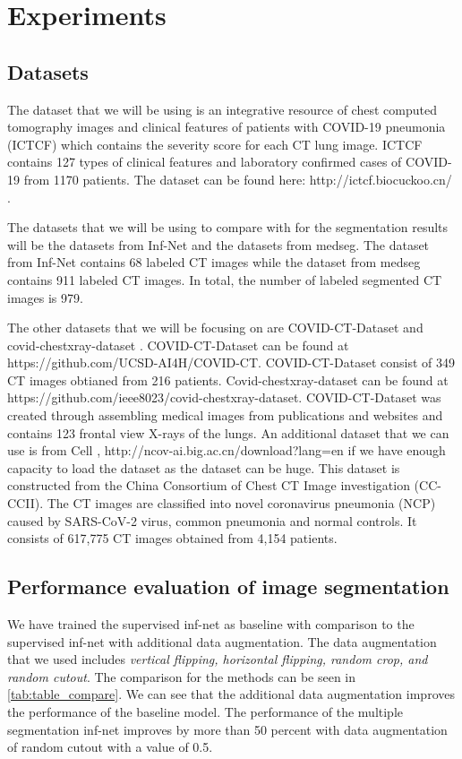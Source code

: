 \section{Experiments}

\subsection{Datasets}
The dataset that we will be using is an integrative resource of chest computed tomography images and clinical features of patients with COVID-19 pneumonia (ICTCF) \cite{ref23} which contains the severity score for each CT lung image. ICTCF contains 127 types of clinical features and laboratory confirmed cases of COVID-19 from 1170 patients. The dataset can be found here: http://ictcf.biocuckoo.cn/ . 

The datasets that we will be using to compare with for the segmentation results will be the datasets from Inf-Net\cite{ref14} and the datasets from medseg\cite{ref26}. The dataset from Inf-Net\cite{ref14} contains 68 labeled CT images while the dataset from medseg contains 911 labeled CT images. In total, the number of labeled segmented CT images is 979.

The other datasets that we will be focusing on are COVID-CT-Dataset \cite{ref21} and covid-chestxray-dataset \cite{ref22}. COVID-CT-Dataset can be found at https://github.com/UCSD-AI4H/COVID-CT. COVID-CT-Dataset consist of 349 CT images obtianed from 216 patients. Covid-chestxray-dataset can be found at https://github.com/ieee8023/covid-chestxray-dataset. COVID-CT-Dataset  was created through assembling medical images from publications and websites and contains 123 frontal view X-rays of the lungs. An additional dataset that we can use is from Cell \cite{ref24}, http://ncov-ai.big.ac.cn/download?lang=en if we have enough capacity to load the dataset as the dataset can be huge. This dataset is constructed from the China Consortium of Chest CT Image investigation (CC-CCII). The CT images are classified into novel coronavirus pneumonia (NCP) caused by SARS-CoV-2 virus, common pneumonia and normal controls. It consists of 617,775 CT images obtained from 4,154 patients.

\subsection{Performance evaluation of image segmentation}
We have trained the supervised inf-net as baseline with comparison to the supervised inf-net with additional data augmentation. The data augmentation that we used includes \textit{vertical flipping, horizontal flipping, random crop, and random cutout}. The comparison for the methods can be seen in \ref{tab:table_compare}. We can see that the additional data augmentation improves the performance of the baseline model. The performance of the multiple segmentation inf-net improves by more than 50 percent with data augmentation of random cutout with a value of 0.5.

